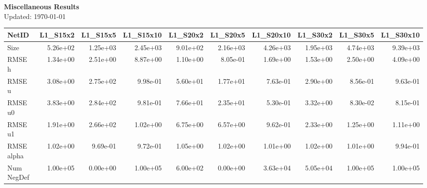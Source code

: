 \documentclass{article}
\theoremstyle{remark}
\numberwithin{equation}{subsection}
\begin{document}
 
	
	
\begin{center}
	\textbf{Miscellaneous Results}
	\\[0.05in]
	Updated: \today 
\end{center}

\tableofcontents

\begin{tabular}{lrrrrrrrrr}
	\toprule
	NetID &  L1\_S15x2 &  L1\_S15x5 &  L1\_S15x10 &  L1\_S20x2 &  L1\_S20x5 &  L1\_S20x10 &  L1\_S30x2 &  L1\_S30x5 &  L1\_S30x10 \\
	\midrule
	Size       &  5.26e+02 &  1.25e+03 &   2.45e+03 &  9.01e+02 &  2.16e+03 &   4.26e+03 &  1.95e+03 &  4.74e+03 &   9.39e+03 \\
	RMSE h     &  1.34e+00 &  2.51e+00 &   8.87e+00 &  1.10e+00 &  8.05e-01 &   1.69e+00 &  1.53e+00 &  2.50e+00 &   4.09e+00 \\
	RMSE u     &  3.08e+00 &  2.75e+02 &   9.98e-01 &  5.60e+01 &  1.77e+01 &   7.63e-01 &  2.90e+00 &  8.56e-01 &   9.63e-01 \\
	RMSE u0    &  3.83e+00 &  2.84e+02 &   9.81e-01 &  7.66e+01 &  2.35e+01 &   5.30e-01 &  3.32e+00 &  8.30e-02 &   8.15e-01 \\
	RMSE u1    &  1.91e+00 &  2.66e+02 &   1.02e+00 &  6.75e+00 &  6.57e+00 &   9.62e-01 &  2.33e+00 &  1.25e+00 &   1.11e+00 \\
	RMSE alpha &  1.02e+00 &  9.69e-01 &   9.72e-01 &  1.05e+00 &  1.02e+00 &   1.01e+00 &  1.02e+00 &  1.01e+00 &   9.94e-01 \\
	Num NegDef &  1.00e+05 &  0.00e+00 &   1.00e+05 &  6.00e+02 &  0.00e+00 &   3.63e+04 &  5.05e+04 &  1.00e+05 &   1.00e+05 \\
	\bottomrule
\end{tabular}
\end{document}
